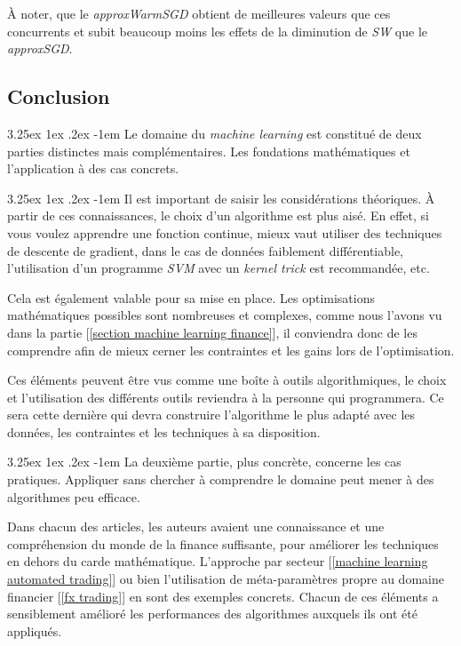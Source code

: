 \documentclass[a4paper, 11pt]{article}
\makeatletter
\renewcommand\paragraph{\@startsection{paragraph}{5}{\z@}%
  {3.25ex \@plus1ex \@minus.2ex}%
  {-1em}%
  {\normalfont\normalsize\bfseries}}
\makeatother
\begin{document}
À noter, que le \textit{approxWarmSGD} obtient de meilleures valeurs que ces concurrents et subit beaucoup moins les effets de la diminution de \textit{SW} que le \textit{approxSGD}.

\subsection{Conclusion}
\paragraph{}
Le domaine du \textit{machine learning} est constitué de deux parties distinctes mais complémentaires.
Les fondations mathématiques et l'application à des cas concrets.

\paragraph{}
Il est important de saisir les considérations théoriques. À partir de ces connaissances, le choix d'un algorithme est plus aisé. En effet, si vous voulez apprendre une fonction continue, mieux vaut utiliser des techniques de descente de gradient, dans le cas de données faiblement différentiable, l'utilisation d'un programme \textit{SVM} avec un \textit{kernel trick} est recommandée, etc.

Cela est également valable pour sa mise en place. Les optimisations mathématiques possibles sont nombreuses et complexes, comme nous l'avons vu dans la partie [\ref{section machine learning finance}], il conviendra donc de les comprendre afin de mieux cerner les contraintes et les gains lors de l'optimisation.

Ces éléments peuvent être vus comme une boîte à outils algorithmiques, le choix et l'utilisation des différents outils reviendra à la personne qui programmera. Ce sera cette dernière qui devra construire l'algorithme le plus adapté avec les données, les contraintes et les techniques à sa disposition.

\paragraph{}
La deuxième partie, plus concrète, concerne les cas pratiques. Appliquer sans chercher à comprendre le domaine peut mener à des algorithmes peu efficace.

Dans chacun des articles, les auteurs avaient une connaissance et une compréhension du monde de la finance suffisante, pour améliorer les techniques en dehors du carde mathématique. L'approche par secteur [\ref{machine learning automated trading}] ou bien l'utilisation de méta-paramètres propre au domaine financier [\ref{fx trading}] en sont des exemples concrets.
Chacun de ces éléments a sensiblement amélioré les performances des algorithmes auxquels ils ont été appliqués.
\end{document}
